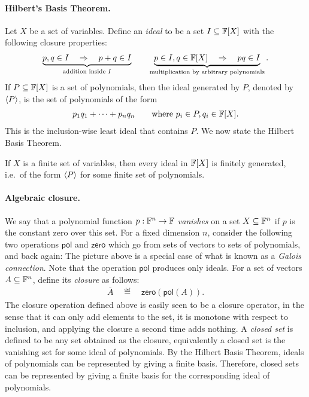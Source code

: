 \paragraph*{Hilbert's Basis Theorem.} Let $X$ be a set of variables.  Define an \emph{ideal} to be a set
$  I \subseteq \mathbb F[X]$ 
with the following closure properties:
\begin{align*}
  \underbrace{p, q \in I \quad \Rightarrow \quad p+q \in I}_{\text{addition inside $I$}} \qquad \underbrace{p \in I, q \in \mathbb F[X] \quad \Rightarrow \quad pq \in I}_{\text{multiplication by arbitrary polynomials}}.
\end{align*}
If $P \subseteq \mathbb F[X]$ is a set of polynomials, then the ideal generated by $P$, denoted by $\langle P \rangle$, is the set of polynomials of the form
\begin{align*}
  p_1 q_1 + \cdots + p_n q_n \qquad \text{where }p_i \in P, q_i \in \mathbb F[X].
\end{align*}
This is the inclusion-wise least ideal that contains $P$. We  now state the Hilbert Basis Theorem.
\begin{theorem}
	If $X$ is a finite set of variables, then every ideal in $\mathbb F[X]$ is finitely generated, i.e.~of the form $\langle P \rangle$ for some finite set of polynomials. 
\end{theorem}

\paragraph*{Algebraic closure.} We say that a polynomial function $p : \mathbb F^n \to \mathbb F$ \emph{vanishes} on a set $X \subseteq \mathbb F^n$ if $p$ is the constant zero over this set. For a fixed dimension $n$, consider the following two operations $\mathsf{pol}$ and $\mathsf{zero}$ which go from sets of vectors to sets of polynomials, and back again: 
The picture above is a special case of what is known as a \emph{Galois connection}.
Note that the operation $\mathsf{pol}$ produces only ideals. For a set of vectors $A \subseteq \mathbb F^n$, define its \emph{closure} as follows:
\begin{align*}
  \bar A \quad \eqdef \quad \mathsf{zero}(\mathsf{pol}(A)).
\end{align*}
The closure operation defined above  is easily seen to be a closure operator, in the sense that it can only add elements to the set, it is monotone with respect to inclusion, and applying the closure a second time adds nothing.  
A \emph{closed set} is defined to be any set obtained as the closure, equivalently a closed set is the vanishing set for some   ideal of polynomials.  By the Hilbert Basis Theorem,  ideals of polynomials can be represented by giving a finite basis. Therefore,  closed sets can be represented by giving a finite basis for the corresponding ideal of polynomials.



